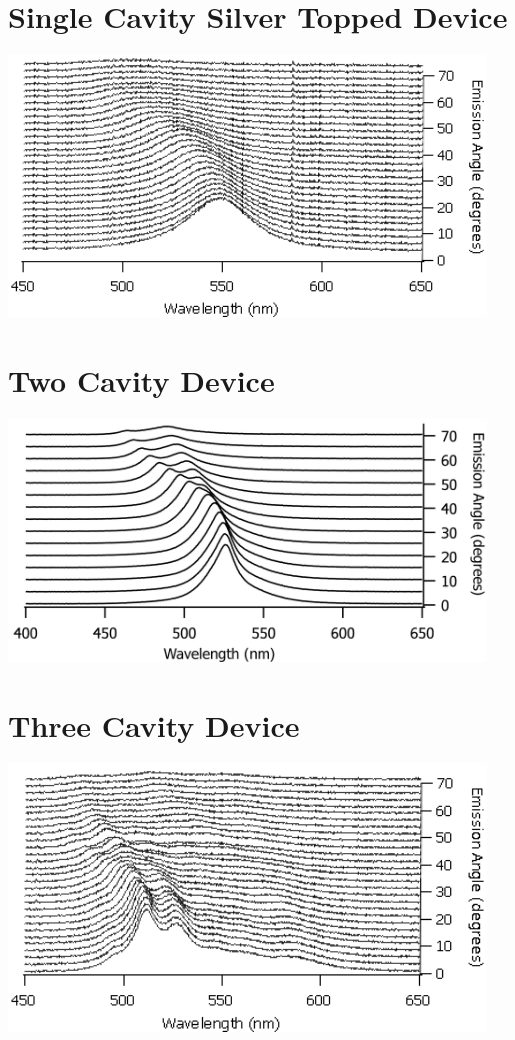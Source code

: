 \documentclass{report}
\begin{document}
    \section*{Single Cavity Silver Topped Device}
    \begin{center}
    \includegraphics[width=0.95\textwidth]{images/n1_ag_top_waterfall.png}
    \end{center}
    
    \section*{Two Cavity Device}
    \begin{center}
    \includegraphics[width=0.95\textwidth]{images/n2_waterfall.png}
    \end{center}
    
    \section*{Three Cavity Device}
    \begin{center}
    \includegraphics[width=0.95\textwidth]{images/n3_waterfall.png}
    \end{center}
    
\end{document}
